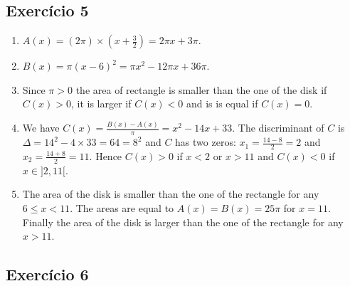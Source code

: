 \subsection*{Exercício 5}

    \begin{enumerate}
  \item $A(x) = {(2\pi)} \times {(x+\frac{3}{2})} = {2\pi x} + {3\pi}$.
  \item $B(x) = \pi {(x - 6)}^2 = \pi x^2 - {12\pi x} + 36 \pi$.
  \item Since $\pi > 0$
    the area of rectangle is smaller than the one of the disk if
    $C(x) > 0$, it is larger if $C(x) < 0$ and is is equal if $C(x) = 0$.
  \item We have
    $C(x) = \frac{B(x) - A(x)}{\pi} = x^2 -14x + 33$.
    The discriminant of $C$ is
    $\Delta = 14^2 - 4 \times 33 = 64=8^2$ and $C$ has two zeros:
    $x_1 = \frac{14-8}{2} = 2$ and $x_2 = \frac{14+8}{2} = 11$.
    Hence $C(x) > 0$ if $x < 2$ or $x > 11$ and $C(x) < 0$ if $x \in ]2,11[$.
  \item The area of the disk is smaller than
    the one of the rectangle for any $6 \leq x < 11$. The areas are equal to
    $A(x)=B(x)=25\pi$ for $x=11$. Finally the area of the disk is larger than
    the one of the rectangle for any $x > 11$.
  \end{enumerate}    

\subsection*{Exercício 6}

